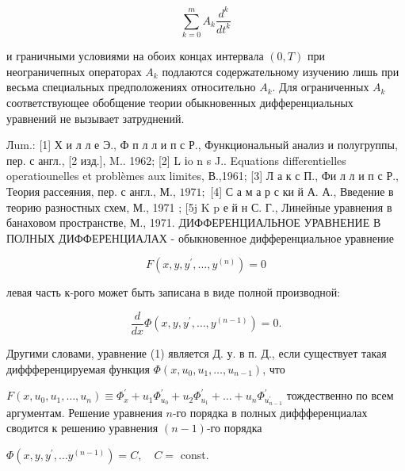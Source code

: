 \documentclass[10pt]{article}
\begin{document}
\[

\sum_{k=0}^{m} A_{k} \frac{d^{k}}{d t^{k}}

\]



и граничными условиями на обоих концах интервала $(0, T)$ при неограничепных операторах $A_{k}$ подлаются содержательному изучению лишь при весьма специальных предположениях относительно $A_{k}$. Для ограниченных $A_{k}$ соответствующее обобщение теории обыкновенных дифференциальных уравнений не вызывает затруднений.



Лum.: [1] Х и л л е Э., Ф п л л и п с Р., Функциональный анализ и полугруппы, пер. с англ., [2 изд.], M.. 1962; [2] L іo n s J.. Equations differentielles operatiounelles et problèmes aux limites, В.,1961; [3] Л а к с П., Фи л л и п с Р., Теория рассеяния, пер. с англ., М., $1971 ;$ [4] С а м а р с ки й А. А., Введение в теорию разностных схем, М., 1971 ; [5j K $\mathrm{p}$ е й н С. Г., Линейные уравнения в банаховом пространстве, М., 1971. ДИФФЕРЕНЦИАЛЬНОЕ УРАВНЕНИЕ В ПОЛНЫХ ДИФФЕРЕНЦИАЛАХ - обыкновенное дифференциальное уравнение



\[

F\left(x, y, y^{\prime}, \ldots, y^{(n)}\right)=0

\]



левая часть к-рого может быть записана в виде полной производной:



\[

\frac{d}{d x} \Phi\left(x, y, y^{\prime}, \ldots, y^{(n-1)}\right)=0 .

\]



Другими словами, уравнение (1) является Д. у. в п. Д., если существует такая диффференцируемая функция $\Phi\left(x, u_{0}, u_{1}, \ldots, u_{n-1}\right)$, что



$F\left(x, u_{0}, u_{1}, \ldots, u_{n}\right) \equiv \Phi_{x}^{\prime}+u_{1} \Phi_{u_{0}}^{\prime}+u_{2} \Phi_{u_{1}}^{\prime}+\ldots+u_{n} \Phi_{u_{n-1}^{\prime}}^{\prime}$ тождественно по всем аргументам. Решение уравнения $n$-го порядка в полных диффференциалах сводится к решению уравнения $(n-1)$-го порядка



$\Phi\left(x, y, y^{\prime}, \ldots y^{(n-1)}\right)=C, \quad C=$ const.
\end{document}

